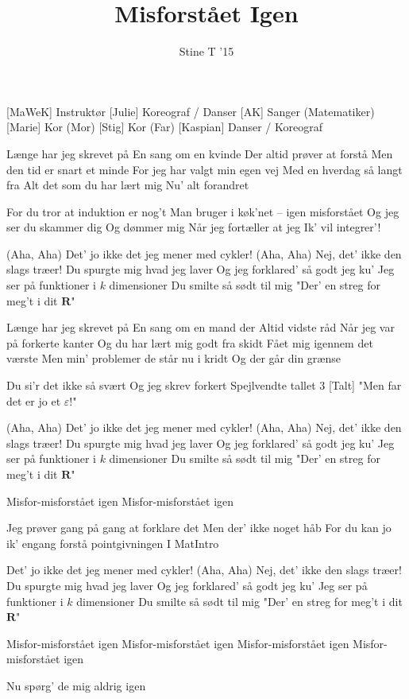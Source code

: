 \documentclass[a4paper,11pt]{article}
\title{Misforstået Igen}
\author{Stine T '15}
\begin{document}
\maketitle

\begin{roles}
[MaWeK] Instruktør
[Julie] Koreograf / Danser
[AK] Sanger (Matematiker)
[Marie] Kor (Mor)
[Stig] Kor (Far)
[Kaspian] Danser / Koreograf
\end{roles}

\begin{song}
 Længe har jeg skrevet på
En sang om en kvinde
Der altid prøver at forstå
Men den tid er snart et minde
For jeg har valgt min egen vej
Med en hverdag så langt fra
Alt det som du har lært mig
Nu' alt forandret

 For du tror at induktion er nog't
Man bruger i køk'net -- igen misforstået
Og jeg ser du skammer dig
Og dømmer mig
Når jeg fortæller at jeg
Ik' vil integrer'!

 (Aha, Aha) Det' jo ikke det jeg mener med cykler!
(Aha, Aha) Nej, det' ikke den slags træer!
Du spurgte mig hvad jeg laver
Og jeg forklared' så godt jeg ku'
Jeg ser på funktioner i $k$ dimensioner
Du smilte så sødt til mig
"Der' en streg for meg't i dit $\mathbf{R}$"

 Længe har jeg skrevet på
En sang om en mand der
Altid vidste råd
Når jeg var på forkerte kanter
Og du har lært mig godt fra skidt
Fået mig igennem det værste
Men min' problemer de står nu i kridt
Og der går din grænse

 Du si'r det ikke så svært
Og jeg skrev forkert
Spejlvendte tallet $3$
[Talt] "Men far det er jo et $\varepsilon$!"

 (Aha, Aha) Det' jo ikke det jeg mener med cykler!
(Aha, Aha) Nej, det' ikke den slags træer!
Du spurgte mig hvad jeg laver
Og jeg forklared' så godt jeg ku'
Jeg ser på funktioner i $k$ dimensioner
Du smilte så sødt til mig
"Der' en streg for meg't i dit $\mathbf{R}$"

 Misfor-misforstået igen
Misfor-misforstået igen

 Jeg prøver gang på gang at forklare det
Men der' ikke noget håb
For du kan jo ik' engang forstå pointgivningen
I MatIntro

 Det' jo ikke det jeg mener med cykler!
(Aha, Aha) Nej, det' ikke den slags træer!
Du spurgte mig hvad jeg laver
Og jeg forklared' så godt jeg ku'
Jeg ser på funktioner i $k$ dimensioner
Du smilte så sødt til mig
"Der' en streg for meg't i dit $\mathbf{R}$"

 Misfor-misforstået igen
Misfor-misforstået igen
Misfor-misforstået igen
Misfor-misforstået igen

 Nu spørg' de mig aldrig igen
\end{song}
\end{document}
